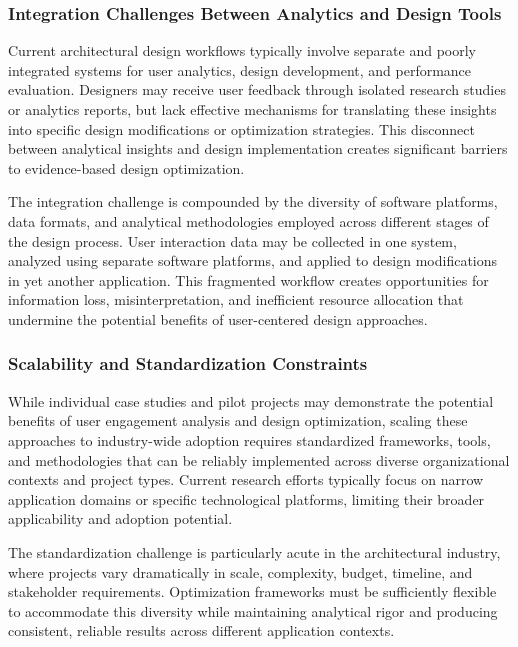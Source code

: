 \subsubsection{Integration Challenges Between Analytics and Design Tools}
\label{subsubsec:integration_challenges}

Current architectural design workflows typically involve separate and poorly integrated systems for user analytics, design development, and performance evaluation. Designers may receive user feedback through isolated research studies or analytics reports, but lack effective mechanisms for translating these insights into specific design modifications or optimization strategies. This disconnect between analytical insights and design implementation creates significant barriers to evidence-based design optimization.

The integration challenge is compounded by the diversity of software platforms, data formats, and analytical methodologies employed across different stages of the design process. User interaction data may be collected in one system, analyzed using separate software platforms, and applied to design modifications in yet another application. This fragmented workflow creates opportunities for information loss, misinterpretation, and inefficient resource allocation that undermine the potential benefits of user-centered design approaches.

\subsubsection{Scalability and Standardization Constraints}
\label{subsubsec:scalability_constraints}

While individual case studies and pilot projects may demonstrate the potential benefits of user engagement analysis and design optimization, scaling these approaches to industry-wide adoption requires standardized frameworks, tools, and methodologies that can be reliably implemented across diverse organizational contexts and project types. Current research efforts typically focus on narrow application domains or specific technological platforms, limiting their broader applicability and adoption potential.

The standardization challenge is particularly acute in the architectural industry, where projects vary dramatically in scale, complexity, budget, timeline, and stakeholder requirements. Optimization frameworks must be sufficiently flexible to accommodate this diversity while maintaining analytical rigor and producing consistent, reliable results across different application contexts.

